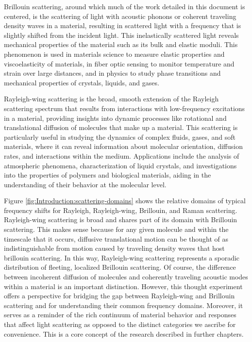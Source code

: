Brillouin scattering, around which much of the work detailed in this document is centered, is the scattering of light with acoustic phonons or coherent traveling density waves in a material, resulting in scattered light with a frequency that is slightly shifted from the incident light. This inelastically scattered light reveals mechanical properties of the material such as its bulk and elastic moduli. This phenomenon is used in materials science to measure elastic properties and viscoelasticity of materials\cite{}, in fiber optic sensing to monitor temperature and strain over large distances\cite{}, and in physics to study phase transitions and mechanical properties of crystals, liquids, and gases\cite{}.

Rayleigh-wing scattering is the broad, smooth extension of the Rayleigh scattering spectrum that results from interactions with low-frequency excitations in a material, providing insights into dynamic processes like rotational and translational diffusion of molecules that make up a material. This scattering is particularly useful in studying the dynamics of complex fluids, gases, and soft materials, where it can reveal information about molecular orientation, diffusion rates, and interactions within the medium. Applications include the analysis of atmospheric phenomena\cite{}, characterization of liquid crystals\cite{}, and investigations into the properties of polymers and biological materials\cite{}, aiding in the understanding of their behavior at the molecular level.

Figure \ref{fig:Introduction:scattering-domains} shows the relative domains of typical frequency shifts for Rayleigh, Rayleigh-wing, Brillouin, and Raman scattering. Rayleigh-wing scattering is broad and shares part of its domain with Brillouin scattering. This makes sense because for any given molecule and within the timescale that it occurs, diffusive translational motion can be thought of as indistinguishable from motion caused by traveling density waves that host brillouin scattering. In this way, Rayleigh-wing scattering represents a sporadic distribution of fleeting, localized Brillouin scattering. Of course, the difference between incoherent diffusion of molecules and coherently traveling acoustic modes within a material is an important distinction. However, this thought experiment offers a perspective for bridging the gap between Rayleigh-wing and Brillouin scattering and for understanding their common frequency domains. Moreover, it serves as a reminder of the rich continuum of material behavior and responses that affect light scattering as opposed to the distinct categories we ascribe for convenience. This is a core concept of the research described in further chapters.%


